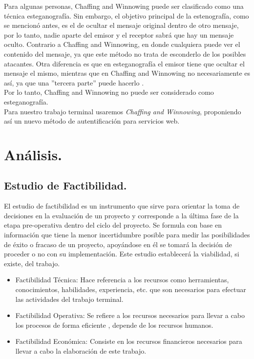 \documentclass[12pt, a4paper, titlepage]{report}
\begin{document}
        Para algunas personas, Chaffing and Winnowing puede ser clasificado como una técnica esteganograf\'ia. Sin embargo, el objetivo principal de la estenografía, como se mencionó antes, es el de ocultar el mensaje original dentro de otro mensaje, por lo tanto, nadie aparte del emisor y el receptor sabrá que hay un mensaje oculto. Contrario a Chaffing and Winnowing, en donde cualquiera puede ver el contenido del mensaje, ya que este método no trata de esconderlo de los posibles atacantes. Otra diferencia es que en esteganograf\'ia el emisor tiene que ocultar el mensaje el mismo, mientras que en Chaffing and Winnowing no necesariamente es así, ya que una ''tercera parte'' puede hacerlo \cite{refChaffingVsEsteganografia}.\\
        
        Por lo tanto, Chaffing and Winnowing no puede ser considerado como esteganograf\'ia.\\
        
         Para nuestro trabajo terminal usaremos \textit{Chaffing and Winnowing}, proponiendo así un nuevo método de autentificación para servicios web. \\

	\chapter{\textcolor{azulescom}{Análisis.}}
	    
    	\section{Estudio de Factibilidad.}
    	El estudio de factibilidad es un instrumento que sirve para orientar la toma de decisiones en la evaluación de un proyecto y corresponde a la última fase de la etapa pre-operativa dentro del ciclo del proyecto. Se formula con base en información que tiene la menor incertidumbre posible para medir las posibilidades de éxito o fracaso de un proyecto, apoyándose en él se tomará la decisión de proceder o no con su implementación. Este estudio establecerá la viabilidad, si existe, del trabajo.
    	\begin{itemize}
    	    \item Factibilidad Técnica: Hace referencia a los recursos como herramientas, conocimientos, habilidades, experiencia, etc. que son necesarios para efectuar las actividades del trabajo terminal.
    	    \item Factibilidad Operativa: Se refiere a los recursos necesarios para llevar a cabo los procesos de forma eficiente , depende de los recursos humanos.
    	    \item Factibilidad Econ\'omica: Consiste en los recursos financieros necesarios para llevar a cabo la elaboraci\'on de este trabajo.
    	\end{itemize}
\end{document}
